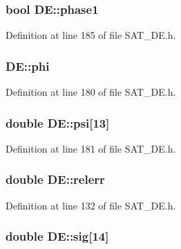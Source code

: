 \hypertarget{classDE_ab9a2adeb8253f3901c1cb39387e35fba}{
\subsubsection[{phase1}]{\setlength{\rightskip}{0pt plus 5cm}bool D\-E\-::phase1\hspace{0.3cm}{\ttfamily [private]}}}\label{classDE_ab9a2adeb8253f3901c1cb39387e35fba}


Definition at line 185 of file S\-A\-T\-\_\-\-D\-E.\-h.

\hypertarget{classDE_a79eb189fb7f3320d735b90ca3332311e}{
\subsubsection[{phi}]{ D\-E\-::phi\hspace{0.3cm}{\ttfamily [private]}}}\label{classDE_a79eb189fb7f3320d735b90ca3332311e}


Definition at line 180 of file S\-A\-T\-\_\-\-D\-E.\-h.

\hypertarget{classDE_a7ef55ab5c646e5f540adcfa6ed392b56}{
\subsubsection[{psi}]{\setlength{\rightskip}{0pt plus 5cm}double D\-E\-::psi\mbox{[}13\mbox{]}\hspace{0.3cm}{\ttfamily [private]}}}\label{classDE_a7ef55ab5c646e5f540adcfa6ed392b56}


Definition at line 181 of file S\-A\-T\-\_\-\-D\-E.\-h.

\hypertarget{classDE_a877edbd8bd4ba297b5602786b552059f}{
\subsubsection[{relerr}]{\setlength{\rightskip}{0pt plus 5cm}double D\-E\-::relerr}}\label{classDE_a877edbd8bd4ba297b5602786b552059f}


Definition at line 132 of file S\-A\-T\-\_\-\-D\-E.\-h.

\hypertarget{classDE_a2ec1db657ea1d2ba57e0221ca0cb3eef}{
\subsubsection[{sig}]{\setlength{\rightskip}{0pt plus 5cm}double D\-E\-::sig\mbox{[}14\mbox{]}\hspace{0.3cm}{\ttfamily [private]}}}\label{classDE_a2ec1db657ea1d2ba57e0221ca0cb3eef}


